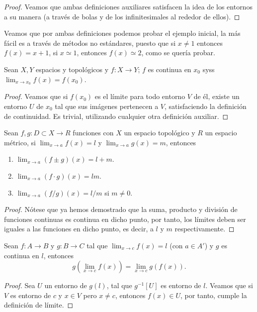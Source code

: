 \documentclass[11pt,oneside,a4paper]{book}
\begin{document}
\begin{proof}
Veamos que ambas definiciones auxiliares satisfacen la idea de los entornos a su manera (a través de bolas y de los infinitesimales al rededor de ellos).
\end{proof}
Veamos que por ambas definiciones podemos probar el ejemplo inicial, la más fácil es a través de métodos no estándares, puesto que si $x\neq 1$ entonces $f(x)=x+1$, si $x\simeq 1$, entonces $f(x)\simeq 2$, como se quería probar.
\begin{thm}
Sean $X,Y$ espacios y topológicos y $f:X\rightarrow Y$; $f$ es continua en $x_0$ syss $\lim_{x\to x_0} f(x)=f(x_0)$.
\end{thm}
\begin{proof}
Veamos que si $f(x_0)$ es el límite para todo entorno $V$ de él, existe un entorno $U$ de $x_0$ tal que sus imágenes pertenecen a $V$, satisfaciendo la definición de continuidad. Es trivial, utilizando cualquier otra definición auxiliar.
\end{proof}
\begin{thm}
Sean $f,g:D\subset X\rightarrow R$ funciones con $X$ un espacio topológico y $R$ un espacio métrico, si $\lim_{x\to a} f(x)=l$ y $\lim_{x\to a} g(x)=m$, entonces
\begin{enumerate}[$a$)]
\item $\displaystyle\lim_{x\to a}(f\pm g)(x)=l+m$.
\item $\displaystyle\lim_{x\to a}(f\cdot g)(x)=lm$.
\item $\displaystyle\lim_{x\to a}(f/g)(x)=l/m$ si $m\neq 0$.
\end{enumerate}
\end{thm}
\begin{proof}
Nótese que ya hemos demostrado que la suma, producto y división de funciones continuas es continua en dicho punto, por tanto, los límites deben ser iguales a las funciones en dicho punto, es decir, a $l$ y $m$ respectivamente.
\end{proof}
\begin{thm}
Sean $f:A\rightarrow B$ y $g:B\rightarrow C$ tal que $\lim_{x\to c}f(x)=l$ (con $a\in A'$) y $g$ es continua en $l$, entonces
$$g\left(\lim_{x\to c}f(x)\right)=\lim_{x\to c}g(f(x)).$$
\end{thm}
\begin{proof}
Sea $U$ un entorno de $g(l)$, tal que $g^{-1}[U]$ es entorno de $l$. Veamos que si $V$ es entorno de $c$ y $x\in V$ pero $x\neq c$, entonces $f(x)\in U$, por tanto, cumple la definición de límite.
\end{proof}
\end{document}
